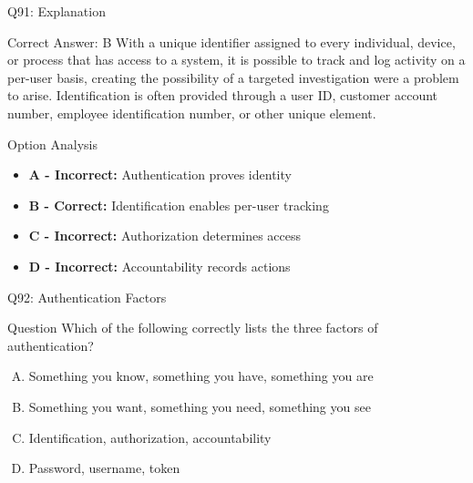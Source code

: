 \documentclass{beamer}
\begin{document}
	\begin{frame}{Q91: Explanation}
		\begin{block}{Correct Answer: B}
			With a unique identifier assigned to every individual, device, or process that has access to a system, it is possible to track and log activity on a per-user basis, creating the possibility of a targeted investigation were a problem to arise. Identification is often provided through a user ID, customer account number, employee identification number, or other unique element.
		\end{block}
		\begin{block}{Option Analysis}
			\begin{itemize}
				\item \textbf{A - Incorrect:} Authentication proves identity
				\item \textbf{B - Correct:} Identification enables per-user tracking
				\item \textbf{C - Incorrect:} Authorization determines access
				\item \textbf{D - Incorrect:} Accountability records actions
			\end{itemize}
		\end{block}
	\end{frame}
	
	\begin{frame}{Q92: Authentication Factors}
		\begin{block}{Question}
			Which of the following correctly lists the three factors of authentication?
		\end{block}
		\begin{enumerate}[(A)]
			\item Something you know, something you have, something you are
			\item Something you want, something you need, something you see
			\item Identification, authorization, accountability
			\item Password, username, token
		\end{enumerate}
	\end{frame}
	
\end{document}
